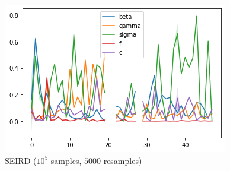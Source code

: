 \documentclass[aspectratio=43]{beamer}
\begin{document}
\begin{frame}
\begin{columns}
		\begin{figure}
			\includegraphics[width=\textwidth]{img/seird_meld_7.png}
			\caption{SEIRD ($10^5$ samples, $5000$ resamples)}
		\end{figure}
	\end{columns}
\end{frame}
\end{document}
